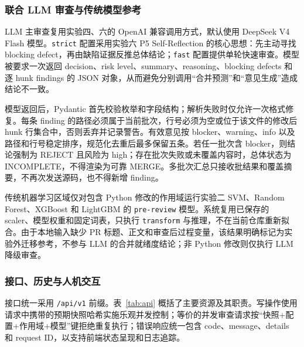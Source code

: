 \documentclass{experimentreport}
\begin{document}
{\subsubsection{联合 LLM 审查与传统模型参考}

LLM 主审查复用实验四、六的 OpenAI 兼容调用方式，默认使用 DeepSeek V4 Flash 模型。\texttt{strict} 配置采用实验六 P5 Self-Reflection 的核心思想：先主动寻找 blocking defect，再由缺陷证据反推总体结论；\texttt{fast} 配置提供单轮快速审查。模型被要求一次返回 decision、risk level、summary、reasoning、blocking defects 和逐 hunk findings 的 JSON 对象，从而避免分别调用“合并预测”和“意见生成”造成结论不一致。

模型返回后，Pydantic 首先校验枚举和字段结构；解析失败时仅允许一次格式修复。每条 finding 的路径必须属于当前批次，行号必须为空或位于该文件的修改后 hunk 行集合中，否则丢弃并记录警告。有效意见按 blocker、warning、info 以及路径和行号稳定排序，规范化去重后最多保留五条。若任一批次含 blocker，则结论强制为 REJECT 且风险为 high；存在批次失败或未覆盖内容时，总体状态为 INCOMPLETE，不得渲染为可靠 MERGE。多批次汇总只接收批结果和覆盖摘要，不再次发送源码，也不得新增 finding。

传统机器学习区域仅对包含 Python 修改的作用域运行实验二 SVM、Random Forest、XGBoost 和 LightGBM 的 \texttt{pre-review} 模型。系统复用已保存的 scaler、模型权重和固定词表，只执行 \texttt{transform} 与推理，不在当前仓库重新拟合。由于本地输入缺少 PR 标题、正文和审查后过程变量，该结果明确标记为实验外迁移参考，不参与 LLM 的合并就绪度结论；非 Python 修改则仅执行 LLM 降级审查。

\subsubsection{接口、历史与人机交互}

接口统一采用 \texttt{/api/v1} 前缀。表~\ref{tab:api} 概括了主要资源及其职责。写操作使用请求中携带的预期快照哈希实施乐观并发控制；等价的并发审查请求按“快照+配置+作用域+模型”键拒绝重复执行；错误响应统一包含 code、message、details 和 request ID，以支持前端状态呈现和日志追踪。

}
\end{document}
